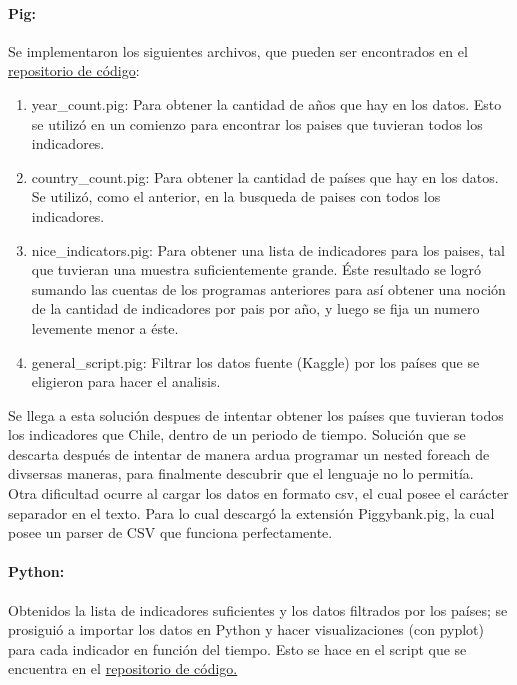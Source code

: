 \documentclass{article}
\begin{document}
\paragraph{Pig:}
Se implementaron los siguientes archivos, que pueden ser encontrados en el \href{https://github.com/programasut/world-dev-analysis/tree/master/pig}{repositorio de código}:
\begin{enumerate}
	\item year\_count.pig: Para obtener la cantidad de años que hay en los datos. Esto se utilizó en un comienzo para encontrar los paises que tuvieran todos los indicadores. 
	\item country\_count.pig: Para obtener la cantidad de países que hay en los datos. Se utilizó, como el anterior, en la busqueda de paises con todos los indicadores.
	\item nice\_indicators.pig: Para obtener una lista de indicadores para los paises, tal que tuvieran una muestra suficientemente grande. Éste resultado se logró sumando las cuentas de los programas anteriores para así obtener una noción de la cantidad de indicadores por pais por año, y luego se fija un numero levemente menor a éste.
	\item general\_script.pig: Filtrar los datos fuente (Kaggle) por los países que se eligieron para hacer el analisis.
\end{enumerate}
Se llega a esta solución despues de intentar obtener los países que tuvieran todos los indicadores que Chile, dentro de un periodo de tiempo. Solución que se descarta después de intentar de manera ardua programar un nested foreach de divsersas maneras, para finalmente descubrir que el lenguaje no lo permitía.\\

Otra dificultad ocurre al cargar los datos en formato csv, el cual posee el carácter separador en el texto. Para lo cual descargó la extensión Piggybank.pig, la cual posee un parser de CSV que funciona perfectamente.\\
\paragraph{Python:}
Obtenidos la lista de indicadores suficientes y los datos filtrados por los países; se prosiguió a importar los datos en Python y hacer visualizaciones (con pyplot) para cada indicador en función del tiempo. Esto se hace en el script que se encuentra en el \href{https://github.com/programasut/world-dev-analysis/tree/master/python}{repositorio de código.}
\end{document}
